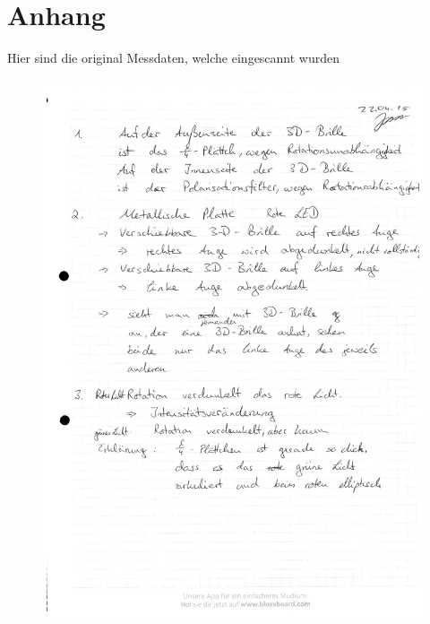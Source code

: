 \documentclass[fontsize=12pt]{scrartcl}
\begin{document}
\section{Anhang}
Hier sind die original Messdaten, welche eingescannt wurden
\begin{figure}[H]
\vspace{-17pt}
        \includegraphics[scale=0.6]{Graphik/1}
        \vspace{-10pt}
\end{figure}
\end{document}
